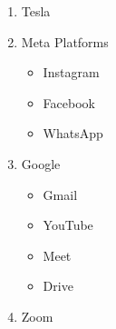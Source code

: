 \documentclass{article}
\begin{document}
  
            \begin{enumerate}   
                  \item Tesla  
                  \item Meta Platforms  
                       \begin{itemize}  
                          \item Instagram  
                          \item Facebook  
                          \item WhatsApp  
                       \end{itemize}  
                  \item Google 
                       \begin{itemize}  
                          \item Gmail  
                          \item YouTube  
                          \item Meet  
                          \item Drive
                       \end{itemize}
                   \item Zoom
              \end{enumerate}  
       
\end{document}
